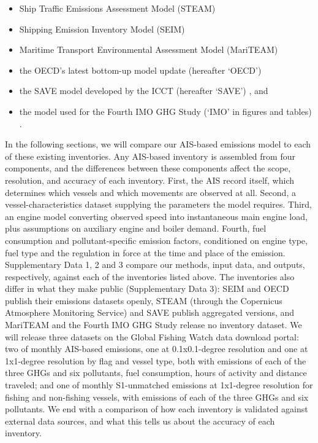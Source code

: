 \begin{itemize}
    \item Ship Traffic Emissions Assessment Model (STEAM) \cite{jalkanen2009modelling, jalkanenExtensionAssessmentModel2012, bergShipEmissionsSO22012, johanssonGlobalAssessmentShipping2017, majamaki2025improving}
    \item Shipping Emission Inventory Model (SEIM) \cite{wangShipEmissionsChina2021, yiHighresolutionGlobalShipping2025}
    \item Maritime Transport Environmental Assessment Model (MariTEAM) \cite{kramelGlobalShippingEmissions2021}
    \item the OECD's latest bottom-up model update (hereafter `OECD') \cite{clarke2023co2, oecdMaritimeTransportCO2Methodology2025}
    \item the SAVE model developed by the ICCT (hereafter `SAVE') \cite{olmer2017greenhouse, documentationV2025031Documentation, mao2025greenhouse}, and
    \item the model used for the Fourth IMO GHG Study (`IMO' in figures and tables) \cite{fourth2020greenhouse}.

\end{itemize}

In the following sections, we will compare our AIS-based emissions model to each of these existing inventories. Any AIS-based inventory is assembled from four components, and the differences between these components affect the scope, resolution, and accuracy of each inventory. First, the AIS record itself, which determines which vessels and which movements are observed at all. Second, a vessel-characteristics dataset supplying the parameters the model requires. Third, an engine model converting observed speed into instantaneous main engine load, plus assumptions on auxiliary engine and boiler demand. Fourth, fuel consumption and pollutant-specific emission factors, conditioned on engine type, fuel type and the regulation in force at the time and place of the emission. Supplementary Data 1, 2 and 3 compare our methods, input data, and outputs, respectively, against each of the inventories listed above. The inventories also differ in what they make public (Supplementary Data 3): SEIM and OECD publish their emissions datasets openly, STEAM (through the Copernicus Atmosphere Monitoring Service) and SAVE publish aggregated versions, and MariTEAM and the Fourth IMO GHG Study release no inventory dataset. We will release three datasets on the Global Fishing Watch data download portal: two of monthly AIS-based emissions, one at 0.1x0.1-degree resolution and one at 1x1-degree resolution by flag and vessel type, both with emissions of each of the three GHGs and six pollutants, fuel consumption, hours of activity and distance traveled; and one of monthly S1-unmatched emissions at 1x1-degree resolution for fishing and non-fishing vessels, with emissions of each of the three GHGs and six pollutants. We end with a comparison of how each inventory is validated against external data sources, and what this tells us about the accuracy of each inventory.

